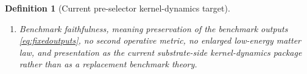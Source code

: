 \documentclass[11pt]{article}
\newcommand{\YoctoSelectorShell}[1]{\mathcal Z_{#1}^{\mathrm{yoc,sel}}}
\newcommand{\PreSectionSelectorProj}[1]{\Pi_{#1}^{\mathrm{presel,sel}}}
\newcommand{\PreSectionSelectorFiber}[2]{\mathcal G_{#1}^{\mathrm{presel,sel}}(#2)}
\newcommand{\KernelBody}[1]{\mathcal K_{#1}^{\mathrm{presel,ker}}}
\newcommand{\KernelProj}[1]{\Lambda_{#1}^{\mathrm{presel,ker}}}
\newcommand{\KernelFunctional}[1]{\mathscr R_{#1}^{\mathrm{presel,ker}}}
\newcommand{\KernelComposedFiber}[2]{\mathcal M_{#1}^{\mathrm{presel,ker}}(#2)}
\newcommand{\KernelShell}[1]{\mathcal Y_{#1}^{\mathrm{presel,ker}}}
\newcommand{\InducedSelectorFunctional}[1]{\widetilde{\mathscr Q}_{#1}^{\mathrm{presel,sel}}}
\newcommand{\InducedSelectorShell}[1]{\widetilde{\mathcal Z}_{#1}^{\mathrm{presel,sel}}}
\newtheorem{definition}{Definition}
\begin{document}
\begin{definition}[Current pre-selector kernel-dynamics target]
\begin{enumerate}
\[    \;
    \InducedSelectorFunctional{\sigma}(u)
    =
    \min_{v\in\PreSectionSelectorFiber{\sigma}{\PreSectionSelectorProj{\sigma}(u)}}
    \InducedSelectorFunctional{\sigma}(v)
    \right\}.
    \]
    The exact kernel shell
    \[
    \KernelShell{\sigma}
    \equiv
    \left\{
    w\in\KernelBody{\sigma}:
    \PreSectionSelectorProj{\sigma}\bigl(\KernelProj{\sigma}(w)\bigr)\in\YoctoSelectorShell{\sigma},
    \;
    \KernelFunctional{\sigma}(w)
    =
    \min_{z\in\KernelComposedFiber{\sigma}{\PreSectionSelectorProj{\sigma}(\KernelProj{\sigma}(w))}}
    \KernelFunctional{\sigma}(z)
    \right\}
    \]
    is required to be a closed embedded submanifold, and
    \[
    \KernelProj{\sigma}\big|_{\KernelShell{\sigma}}
    :
    \KernelShell{\sigma}\xrightarrow{\cong}\InducedSelectorShell{\sigma}
    \]
    is required to be a diffeomorphism.
    \item Benchmark faithfulness, meaning preservation of the benchmark outputs \eqref{eq:fixedoutputs}, no second operative metric, no enlarged low-energy matter law, and presentation as the current substrate-side kernel-dynamics package rather than as a replacement benchmark theory.
\end{enumerate}
\end{definition}
\end{document}
